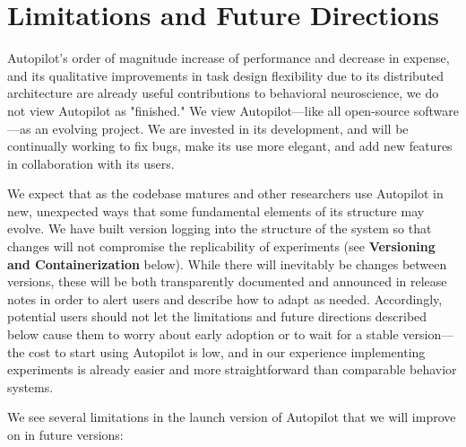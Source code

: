\chapter{Limitations and Future Directions}
\label{sec:future}
\begin{fullwidth}

 Autopilot's order of magnitude increase of performance and decrease in expense, and its qualitative improvements in task design flexibility due to its distributed architecture are already useful contributions to behavioral neuroscience, we do not view Autopilot as "finished." We view Autopilot---like all open-source software---as an evolving project. We are invested in its development, and will be continually working to fix bugs, make its use more elegant, and add new features in collaboration with its users. 

We expect that as the codebase matures and other researchers use Autopilot in new, unexpected ways that some fundamental elements of its structure may evolve. We have built version logging into the structure of the system so that changes will not compromise the replicability of experiments (see \textbf{Versioning and Containerization} below). While there will inevitably be changes between versions, these will be both transparently documented and announced in release notes in order to alert users and describe how to adapt as needed. Accordingly, potential users should not let the limitations and future directions described below cause them to worry about early adoption or to wait for a stable version---the cost to start using Autopilot is low, and in our experience implementing experiments is already easier and more straightforward than comparable behavior systems. 

\vspace{12pt}

\noindent We see several limitations in the launch version of Autopilot that we will improve on in future versions:



\end{fullwidth}
